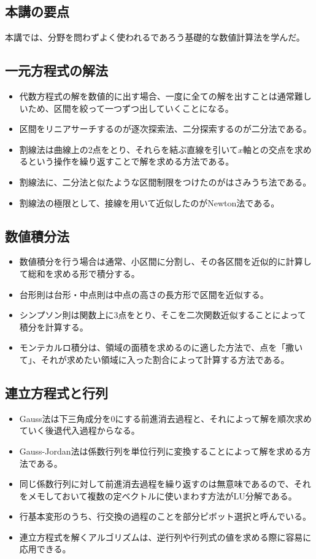 \begin{shadebox}
\section*{本講の要点}
本講では、分野を問わずよく使われるであろう基礎的な数値計算法を学んだ。

\subsection*{一元方程式の解法}
\begin{itemize}
\item 代数方程式の解を数値的に出す場合、一度に全ての解を出すことは通常難しいため、区間を絞って一つずつ出していくことになる。
\item 区間をリニアサーチするのが逐次探索法、二分探索するのが二分法である。
\item 割線法は曲線上の2点をとり、それらを結ぶ直線を引いて$x$軸との交点を求めるという操作を繰り返すことで解を求める方法である。
\item 割線法に、二分法と似たような区間制限をつけたのがはさみうち法である。
\item 割線法の極限として、接線を用いて近似したのがNewton法である。
\end{itemize}

\subsection*{数値積分法}
\begin{itemize}
\item 数値積分を行う場合は通常、小区間に分割し、その各区間を近似的に計算して総和を求める形で積分する。
\item 台形則は台形・中点則は中点の高さの長方形で区間を近似する。
\item シンプソン則は関数上に3点をとり、そこを二次関数近似することによって積分を計算する。
\item モンテカルロ積分は、領域の面積を求めるのに適した方法で、点を「撒いて」、それが求めたい領域に入った割合によって計算する方法である。
\end{itemize}

\subsection*{連立方程式と行列}
\begin{itemize}
\item Gauss法は下三角成分を0にする前進消去過程と、それによって解を順次求めていく後退代入過程からなる。
\item Gauss-Jordan法は係数行列を単位行列に変換することによって解を求める方法である。
\item 同じ係数行列に対して前進消去過程を繰り返すのは無意味であるので、それをメモしておいて複数の定ベクトルに使いまわす方法がLU分解である。
\item 行基本変形のうち、行交換の過程のことを部分ピボット選択と呼んでいる。
\item 連立方程式を解くアルゴリズムは、逆行列や行列式の値を求める際に容易に応用できる。
\end{itemize}

\end{shadebox}
